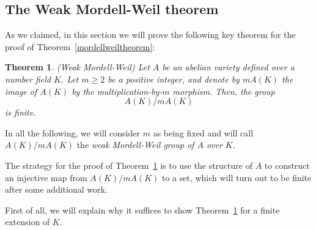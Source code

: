 \documentclass[a4paper, 12pt]{amsart}
\theoremstyle{definition}
\theoremstyle{plain}
\theoremstyle{plain}
\newtheorem{thm0}[defn0]{Theorem}
\theoremstyle{plain}
\theoremstyle{plain}
\theoremstyle{remark}
\theoremstyle{remark}
\theoremstyle{plain}
\newenvironment{theorem}{ \begin{thm0}}{\end{thm0}}
\newcommand{\thmref}[1]{Theorem~\ref{#1}}
\begin{document}
	\subsection{The Weak Mordell-Weil theorem}
	As we claimed, in this section we will prove the following key theorem for the proof of \thmref{mordellweiltheorem}:
	\begin{theorem}\label{weakmordellweil}(Weak Mordell-Weil)
		Let $A$ be an abelian variety defined over a number field $K$. Let $m\ge 2$ be a positive integer, and denote by $mA(K)$ the image of $A(K)$ by the multiplication-by-$m$ morphism. Then, the group
		\begin{equation*}
			A(K)/mA(K)
		\end{equation*}
		is finite.
	\end{theorem}
	
	In all the following, we will consider $m$ as being fixed and will call $A(K)/mA(K)$ the \emph{weak Mordell-Weil group of $A$ over $K$}.
	
	The strategy for the proof of \thmref{weakmordellweil} is to use the structure of $A$ to construct an injective map from $A(K)/mA(K)$ to a set, which will turn out to be finite after some additional work.
	
	First of all, we will explain why it suffices to show \thmref{weakmordellweil} for a finite extension of $K$.
	
\end{document}
